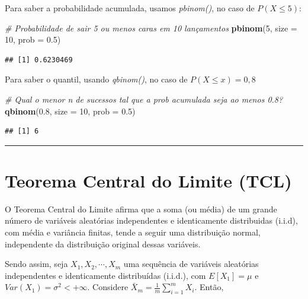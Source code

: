 \documentclass[
]{book}
\newenvironment{Shaded}{\begin{snugshade}}{\end{snugshade}}
\newcommand{\AttributeTok}[1]{\textcolor[rgb]{0.13,0.29,0.53}{#1}}
\newcommand{\CommentTok}[1]{\textcolor[rgb]{0.56,0.35,0.01}{\textit{#1}}}
\newcommand{\DecValTok}[1]{\textcolor[rgb]{0.00,0.00,0.81}{#1}}
\newcommand{\FloatTok}[1]{\textcolor[rgb]{0.00,0.00,0.81}{#1}}
\newcommand{\FunctionTok}[1]{\textcolor[rgb]{0.13,0.29,0.53}{\textbf{#1}}}
\newcommand{\NormalTok}[1]{#1}
\begin{document}
Para saber a probabilidade acumulada, usamos \emph{pbinom()}, no caso de \(P(X \leq 5)\):

\begin{Shaded}
\begin{Highlighting}[]
\CommentTok{\# Probabilidade de sair 5 ou menos caras em 10 lançamentos}
\FunctionTok{pbinom}\NormalTok{(}\DecValTok{5}\NormalTok{, }\AttributeTok{size =} \DecValTok{10}\NormalTok{, }\AttributeTok{prob =} \FloatTok{0.5}\NormalTok{)}
\end{Highlighting}
\end{Shaded}

\begin{verbatim}
## [1] 0.6230469
\end{verbatim}

Para saber o quantil, usando \emph{qbinom()}, no caso de \(P(X \leq x) = 0,8\)

\begin{Shaded}
\begin{Highlighting}[]
\CommentTok{\# Qual o menor n de sucessos tal que a prob acumulada seja ao menos 0.8?}
\FunctionTok{qbinom}\NormalTok{(}\FloatTok{0.8}\NormalTok{, }\AttributeTok{size =} \DecValTok{10}\NormalTok{, }\AttributeTok{prob =} \FloatTok{0.5}\NormalTok{)}
\end{Highlighting}
\end{Shaded}

\begin{verbatim}
## [1] 6
\end{verbatim}

\begin{center}\rule{0.5\linewidth}{0.5pt}\end{center}

\section{Teorema Central do Limite (TCL)}\label{teorema-central-do-limite-tcl}

O Teorema Central do Limite afirma que a soma (ou média) de um grande número de variáveis aleatórias independentes e identicamente distribuidas (i.i.d), com média e variância finitas, tende a seguir uma distribuição normal, independente da distribuição original dessas variáveis.

Sendo assim, seja \(X_1, X_2, \cdots, X_m\) uma sequência de variáveis aleatórias independentes e identicamente distribuídas (i.i.d.), com \(E[X_1]=\mu\) e \(Var(X_1)=\sigma^2<+\infty\). Considere \(\bar{X}_m = \frac{1}{m}\sum_{i=1}^mX_i\). Então,
\end{document}
